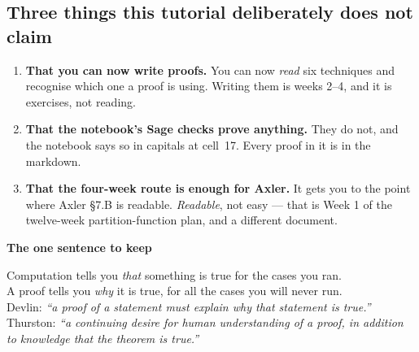\subsection{Three things this tutorial deliberately does not claim}

\begin{enumerate}\setlength{\itemsep}{4pt}
\item \textbf{That you can now write proofs.} You can now \emph{read} six techniques and recognise
 which one a proof is using. Writing them is weeks 2--4, and it is exercises, not reading.
\item \textbf{That the notebook's Sage checks prove anything.} They do not, and the notebook says so
 in capitals at cell~17. Every proof in it is in the markdown.
\item \textbf{That the four-week route is enough for Axler.} It gets you to the point where Axler
 §7.B is readable. \emph{Readable}, not easy --- that is Week 1 of the twelve-week partition-function
 plan, and a different document.
\end{enumerate}

\vfill
\begin{center}
\begin{tcolorbox}[enhanced,width=0.94\textwidth,colback=proof!6,colframe=proof,
 boxrule=1.2pt,arc=5pt,left=12pt,right=12pt,top=10pt,bottom=10pt]
\centering
{\large\bfseries\color{proof} The one sentence to keep}\\[7pt]
\begin{minipage}{0.88\textwidth}\centering
Computation tells you \emph{that} something is true for the cases you ran.\\
A proof tells you \emph{why} it is true, for all the cases you will never run.\\[6pt]
{\footnotesize\color{slate}Devlin: \emph{``a proof of a statement must explain why that statement is
true.''}\\
Thurston: \emph{``a continuing desire for human understanding of a proof, in addition to knowledge
that the theorem is true.''}}
\end{minipage}
\end{tcolorbox}
\end{center}
\vfill
